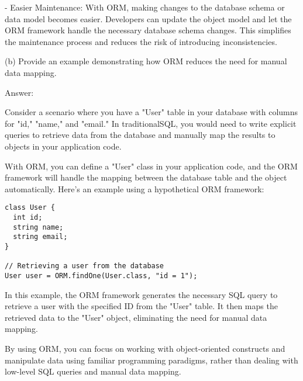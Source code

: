 \documentclass{article}
\begin{document}
- Easier Maintenance: With ORM, making changes to the database schema or data model becomes easier. Developers can update the object model and let the ORM framework handle the necessary database schema changes. This simplifies the maintenance process and reduces the risk of introducing inconsistencies.

(b) Provide an example demonstrating how ORM reduces the need for manual data mapping.

Answer:

Consider a scenario where you have a "User" table in your database with columns for "id," "name," and "email." In traditionalSQL, you would need to write explicit queries to retrieve data from the database and manually map the results to objects in your application code.

With ORM, you can define a "User" class in your application code, and the ORM framework will handle the mapping between the database table and the object automatically. Here's an example using a hypothetical ORM framework:

\begin{verbatim}
class User {
  int id;
  string name;
  string email;
}

// Retrieving a user from the database
User user = ORM.findOne(User.class, "id = 1");
\end{verbatim}

In this example, the ORM framework generates the necessary SQL query to retrieve a user with the specified ID from the "User" table. It then maps the retrieved data to the "User" object, eliminating the need for manual data mapping.

By using ORM, you can focus on working with object-oriented constructs and manipulate data using familiar programming paradigms, rather than dealing with low-level SQL queries and manual data mapping.
\end{document}
